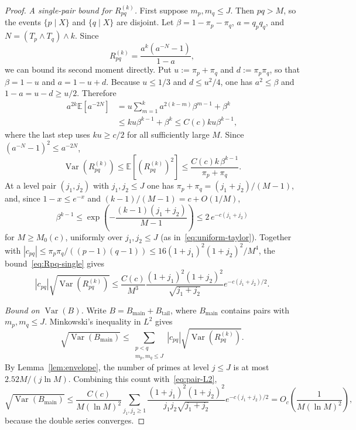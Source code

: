 \documentclass[11pt]{article}
\theoremstyle{remark}
\newcommand{\EE}{\mathbb{E}}
\DeclareMathOperator{\Var}{Var}
\begin{document}
\begin{proof}
\textit{A single-pair bound for $R_{pq}^{(k)}$.}
First suppose $m_p,m_q\leq J$. Then $pq>M$, so the events $\{p\mid X\}$ and $\{q\mid X\}$ are disjoint. Let $\beta=1-\pi_p-\pi_q$, $a=q_pq_q$, and $N=(T_p\wedge T_q)\wedge k$. Since
\[
R_{pq}^{(k)}=\frac{a^k(a^{-N}-1)}{1-a},
\]
we can bound its second moment directly. Put $u:=\pi_p+\pi_q$ and $d:=\pi_p\pi_q$, so that $\beta=1-u$ and $a=1-u+d$. Because $u\leq1/3$ and $d\leq u^2/4$, one has $a^2\leq\beta$ and $1-a=u-d\geq u/2$. Therefore
\begin{align*}
a^{2k}\EE[a^{-2N}]
&=u\sum_{m=1}^k a^{2(k-m)}\beta^{m-1}+\beta^k\\
&\leq ku\beta^{k-1}+\beta^k
\leq C(c)ku\beta^{k-1},
\end{align*}
where the last step uses $ku\geq c/2$ for all sufficiently large $M$. Since $(a^{-N}-1)^2\leq a^{-2N}$,
\begin{equation}\label{eq:Rpq-single}
\Var(R_{pq}^{(k)})
\leq \EE[(R_{pq}^{(k)})^2]
\leq \frac{C(c)k\,\beta^{k-1}}{\pi_p+\pi_q}.
\end{equation}
At a level pair $(j_1, j_2)$ with $j_1, j_2 \leq J$ one has $\pi_p + \pi_q = (j_1+j_2)/(M-1)$, and, since $1 - x \leq e^{-x}$ and $(k-1)/(M-1) = c + O(1/M)$,
\[
\beta^{k-1} \leq \exp\!\left(-\frac{(k-1)(j_1+j_2)}{M-1}\right) \leq 2\, e^{-c(j_1+j_2)}
\]
for $M \geq M_0(c)$, uniformly over $j_1, j_2 \leq J$ (as in~\eqref{eq:uniform-taylor}). Together with $|c_{pq}|\leq \pi_p\pi_q/((p-1)(q-1)) \leq 16(1+j_1)^2(1+j_2)^2/M^4$, the bound~\eqref{eq:Rpq-single} gives
\begin{equation}\label{eq:pair-L2}
|c_{pq}|\sqrt{\Var(R_{pq}^{(k)})}
\leq \frac{C(c)}{M^3}
\frac{(1+j_1)^2(1+j_2)^2}{\sqrt{j_1+j_2}}
 e^{-c(j_1+j_2)/2}.
\end{equation}

\textit{Bound on $\Var(B)$.}
Write $B=B_{\mathrm{main}}+B_{\mathrm{tail}}$, where $B_{\mathrm{main}}$ contains pairs with $m_p,m_q\leq J$. Minkowski's inequality in $L^2$ gives
\[
\sqrt{\Var(B_{\mathrm{main}})}
\leq \sum_{\substack{p<q\\m_p,m_q\leq J}}
|c_{pq}|\sqrt{\Var(R_{pq}^{(k)})}.
\]
By Lemma~\ref{lem:envelope}, the number of primes at level $j\leq J$ is at most $2.52M/(j\ln M)$. Combining this count with~\eqref{eq:pair-L2},
\[
\sqrt{\Var(B_{\mathrm{main}})}
\leq \frac{C(c)}{M(\ln M)^2}
\sum_{j_1,j_2\geq1}
\frac{(1+j_1)^2(1+j_2)^2}{j_1j_2\sqrt{j_1+j_2}}
 e^{-c(j_1+j_2)/2}
=O_c\!\left(\frac{1}{M(\ln M)^2}\right),
\]
because the double series converges.


\end{proof}
\end{document}

